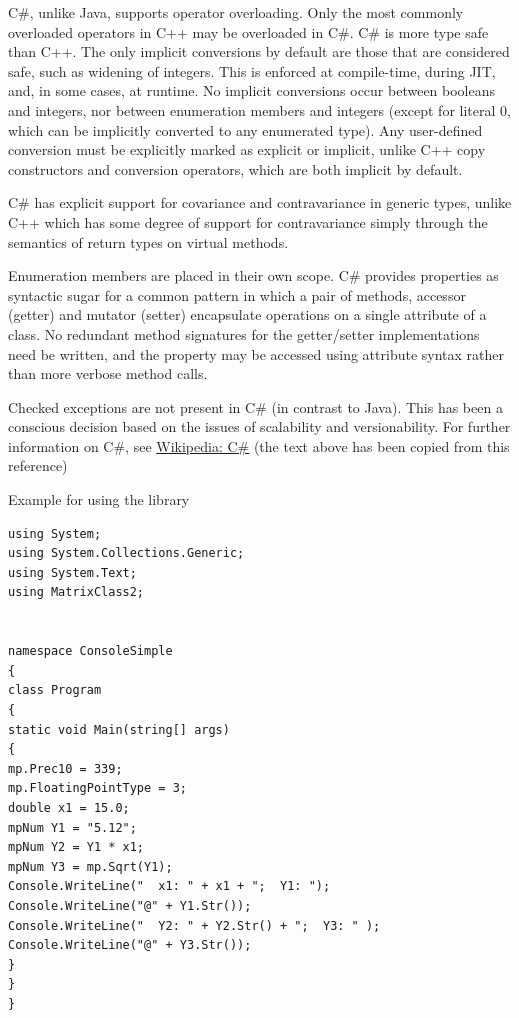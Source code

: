 \vpara
C\#, unlike Java, supports operator overloading. Only the most commonly overloaded operators in C++ may be overloaded in C\#.
C\# is more type safe than C++. The only implicit conversions by default are those that are considered safe, such as widening of integers. This is enforced at compile-time, during JIT, and, in some cases, at runtime. No implicit conversions occur between booleans and integers, nor between enumeration members and integers (except for literal 0, which can be implicitly converted to any enumerated type). Any user-defined conversion must be explicitly marked as explicit or implicit, unlike C++ copy constructors and conversion operators, which are both implicit by default.

\vpara
C\# has explicit support for covariance and contravariance in generic types, unlike C++ which has some degree of support for contravariance simply through the semantics of return types on virtual methods.

\vpara
Enumeration members are placed in their own scope.
C\# provides properties as syntactic sugar for a common pattern in which a pair of methods, accessor (getter) and mutator (setter) encapsulate operations on a single attribute of a class. No redundant method signatures for the getter/setter implementations need be written, and the property may be accessed using attribute syntax rather than more verbose method calls.

\vpara
Checked exceptions are not present in C\# (in contrast to Java). This has been a conscious decision based on the issues of scalability and versionability.
For further information on C\#, see \href{http://en.wikipedia.org/wiki/C_Sharp_(programming_language)}{Wikipedia: C\#} (the text above has been copied from this reference)

\vpara
Example for using the library

\begin{lstlisting}
using System;
using System.Collections.Generic;
using System.Text;
using MatrixClass2;


namespace ConsoleSimple
{
class Program
{
static void Main(string[] args)
{
mp.Prec10 = 339;
mp.FloatingPointType = 3;
double x1 = 15.0;
mpNum Y1 = "5.12";
mpNum Y2 = Y1 * x1;
mpNum Y3 = mp.Sqrt(Y1);
Console.WriteLine("  x1: " + x1 + ";  Y1: ");
Console.WriteLine("@" + Y1.Str());
Console.WriteLine("  Y2: " + Y2.Str() + ";  Y3: " );
Console.WriteLine("@" + Y3.Str());
}
}
}

\end{lstlisting}


